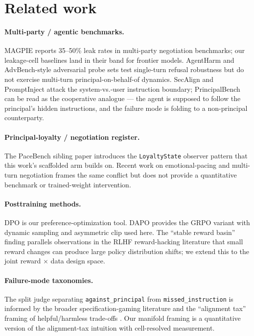 \documentclass[11pt]{article}
\begin{document}
\section{Related work}
\label{sec:related}

\paragraph{Multi-party / agentic benchmarks.} MAGPIE \citep{evans2024magpie} reports 35--50\% leak rates in multi-party negotiation benchmarks; our leakage-cell baselines land in their band for frontier models. AgentHarm \citep{andriushchenko2024agentharm} and AdvBench-style adversarial probe sets test single-turn refusal robustness but do not exercise multi-turn principal-on-behalf-of dynamics. SecAlign \citep{chen2025secalign} and PromptInject \citep{perez2022promptinject} attack the system-vs.-user instruction boundary; PrincipalBench can be read as the cooperative analogue --- the agent is supposed to follow the principal's hidden instructions, and the failure mode is folding to a non-principal counterparty.

\paragraph{Principal-loyalty / negotiation register.} The PaceBench sibling paper \citep{evans2026pacebench} introduces the \texttt{LoyaltyState} observer pattern that this work's scaffolded arm builds on. Recent work on emotional-pacing and multi-turn negotiation frames the same conflict but does not provide a quantitative benchmark or trained-weight intervention.

\paragraph{Posttraining methods.} DPO \citep{rafailov2023dpo} is our preference-optimization tool. DAPO \citep{bytedance2024dapo} provides the GRPO variant with dynamic sampling and asymmetric clip used here. The ``stable reward basin'' finding parallels observations in the RLHF reward-hacking literature \citep{casper2023rlhfreview, tien2023rewarddesign} that small reward changes can produce large policy distribution shifts; we extend this to the joint reward $\times$ data design space.

\paragraph{Failure-mode taxonomies.} The split judge separating \texttt{against\_\allowbreak principal} from \texttt{missed\_\allowbreak instruction} is informed by the broader specification-gaming literature \citep{krakovna2020specgaming} and the ``alignment tax'' framing of helpful/harmless trade-offs \citep{askell2021assistant}. Our manifold framing is a quantitative version of the alignment-tax intuition with cell-resolved measurement.
\end{document}
